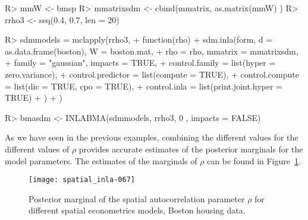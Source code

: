 \documentclass[article]{jss}
\begin{document}
\begin{Schunk}
\begin{Sinput}
R> mmW <- bmsp %*% mmatrix[,-1]#Remove intercept
R> mmatrixsdm <- cbind(mmatrix, as.matrix(mmW) )
R> rrho3 <- seq(0.4, 0.7, len = 20)
\end{Sinput}
\end{Schunk}

\begin{Schunk}
\begin{Sinput}
R> sdmmodels = mclapply(rrho3,
+          function(rho) {
+                  sdm.inla(form, d = as.data.frame(boston), W = boston.mat, 
+  			rho = rho, mmatrix = mmatrixsdm,
+                          family = "gaussian", impacts = TRUE,
+                          control.family = list(hyper = zero.variance),
+                          control.predictor = list(compute = TRUE),
+                          control.compute = list(dic = TRUE, cpo = TRUE),
+                          control.inla = list(print.joint.hyper = TRUE)
+                  )
+          })
\end{Sinput}
\end{Schunk}

\begin{Schunk}
\begin{Sinput}
R> bmasdm <- INLABMA(sdmmodels, rrho3, 0 , impacts = FALSE)
\end{Sinput}
\end{Schunk}

As we have seen in the previous examples, combining the different values 
for the different values of $\rho$ provides accurate estimates of the posterior
marginals for the model parameters. The estimates of the marginals of
$\rho$ can be found in Figure~\ref{fig:pmargrho}.

\begin{figure}[h]
\begin{center}
\texttt{[image: spatial\_inla-067]}
\end{center}
\caption{Posterior marginal of the spatial autocorrelation parameter $\rho$
for different spatial econometrics models, Boston housing data.}
\label{fig:pmargrho}
\end{figure} 




\end{document}
